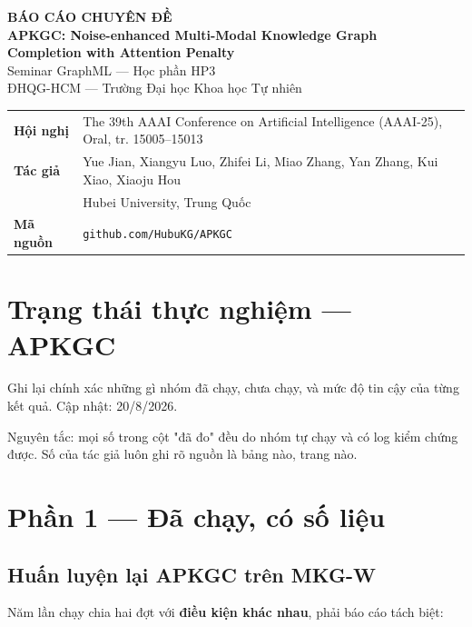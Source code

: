 \documentclass[11pt,a4paper]{article}
\begin{document}
\begin{center}
  {\sffamily\LARGE\bfseries\color{hcmusblue} BÁO CÁO CHUYÊN ĐỀ}\\[8pt]
  {\sffamily\large\bfseries APKGC: Noise-enhanced Multi-Modal Knowledge Graph\\
   Completion with Attention Penalty}\\[10pt]
  {\small Seminar GraphML --- Học phần HP3}\\[2pt]
  {\small ĐHQG-HCM --- Trường Đại học Khoa học Tự nhiên}
\end{center}

\vspace{4pt}
\begin{center}\small
\begin{tabular}{@{}ll@{}}
  \toprule
  \textbf{Hội nghị} & The 39th AAAI Conference on Artificial Intelligence
                      (AAAI-25), Oral, tr. 15005--15013\\
  \textbf{Tác giả}  & Yue Jian, Xiangyu Luo, Zhifei Li, Miao Zhang, Yan Zhang,
                      Kui Xiao, Xiaoju Hou\\
                    & Hubei University, Trung Quốc\\
  \textbf{Mã nguồn} & \texttt{github.com/HubuKG/APKGC}\\
  \bottomrule
\end{tabular}
\end{center}

\vspace{6pt}
\section{Trạng thái thực nghiệm --- APKGC}
Ghi lại chính xác những gì nhóm đã chạy, chưa chạy, và mức độ tin cậy của từng kết quả. Cập nhật: 20/8/2026.

Nguyên tắc: mọi số trong cột "đã đo" đều do nhóm tự chạy và có log kiểm chứng được. Số của tác giả luôn ghi rõ nguồn là bảng nào, trang nào.

\section{Phần 1 --- Đã chạy, có số liệu}
\subsection{Huấn luyện lại APKGC trên MKG-W}
Năm lần chạy chia hai đợt với \textbf{điều kiện khác nhau}, phải báo cáo tách biệt:
\end{document}
